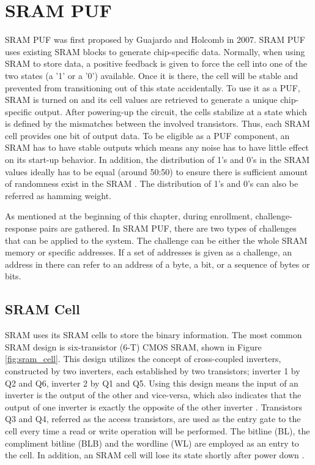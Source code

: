 \section{SRAM PUF}

SRAM PUF was first proposed by Guajardo and Holcomb in 2007. SRAM PUF uses existing SRAM blocks to generate chip-specific data.
Normally, when using SRAM to store data, a positive feedback is given to force the cell into one of the two states (a '1' or a '0') available. Once it is there, the cell will be stable and prevented from transitioning out of this state accidentally.
To use it as a PUF, SRAM is turned on and its cell values are retrieved to generate a unique chip-specific output. After powering-up the circuit, the cells stabilize at a state which is defined by the mismatches between the involved transistors. Thus, each SRAM cell provides one bit of output data. To be eligible as a PUF component, an SRAM has to have stable outputs which means any noise has to have little effect on its start-up behavior. In addition, the distribution of 1's and 0's in the SRAM values ideally has to be equal (around 50:50) to ensure there is sufficient amount of randomness exist in the SRAM \cite{6865541}. The distribution of 1's and 0's can also be referred as hamming weight.

As mentioned at the beginning of this chapter, during enrollment, challenge-response pairs are gathered. In SRAM PUF, there are two types of challenges that can be applied to the system. The challenge can be either the whole SRAM memory or specific addresses. If a set of addresses is given as a challenge, an address in there can refer to an address of a byte, a bit, or a sequence of bytes or bits.

\subsection{SRAM Cell}
SRAM uses its SRAM cells to store the binary information. The most common SRAM design is six-transistor (6-T) CMOS SRAM, shown in Figure \ref{fig:sram_cell}. This design utilizes the concept of cross-coupled inverters, constructed by two inverters, each established by two transistors; inverter 1 by Q2 and Q6, inverter 2 by Q1 and Q5. Using this design means the input of an inverter is the output of the other and vice-versa, which also indicates that the output of one inverter is exactly the opposite of the other inverter \cite{modeling_sram}.
Transistors Q3 and Q4, referred as the access transistors, are used as the entry gate to the cell every time a read or write operation will be performed. The bitline (BL), the compliment bitline (BLB) and the wordline (WL) are employed as an entry to the cell. In addition, an SRAM cell will lose its state shortly after power down \cite{maes_2016}.

